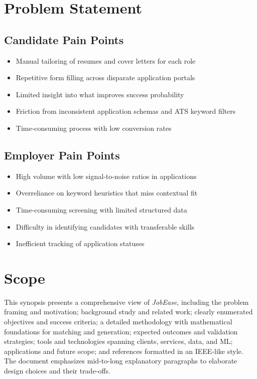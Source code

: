 \documentclass[12pt,a4paper]{report}
\begin{document}
\section{Problem Statement}
\subsection{Candidate Pain Points}
\begin{itemize}[leftmargin=2em]
  \item Manual tailoring of resumes and cover letters for each role
  \item Repetitive form filling across disparate application portals
  \item Limited insight into what improves success probability
  \item Friction from inconsistent application schemas and ATS keyword filters
  \item Time-consuming process with low conversion rates
\end{itemize}

\subsection{Employer Pain Points}
\begin{itemize}[leftmargin=2em]
  \item High volume with low signal-to-noise ratios in applications
  \item Overreliance on keyword heuristics that miss contextual fit
  \item Time-consuming screening with limited structured data
  \item Difficulty in identifying candidates with transferable skills
  \item Inefficient tracking of application statuses
\end{itemize}

\section{Scope}
This synopsis presents a comprehensive view of \textit{JobEase}, including the problem framing and motivation; background study and related work; clearly enumerated objectives and success criteria; a detailed methodology with mathematical foundations for matching and generation; expected outcomes and validation strategies; tools and technologies spanning clients, services, data, and ML; applications and future scope; and references formatted in an IEEE-like style. The document emphasizes mid-to-long explanatory paragraphs to elaborate design choices and their trade-offs.
\end{document}
